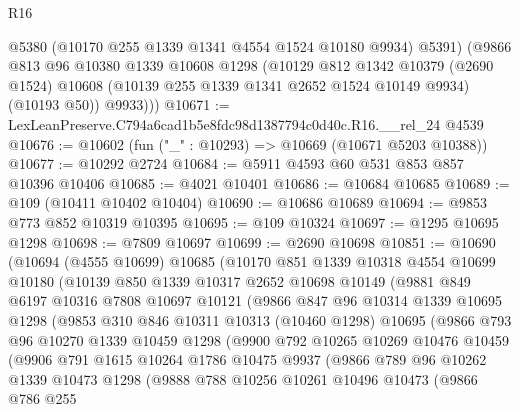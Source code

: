 \begin{lexlean}{R16}
\begin{coremodule}
          @5380
          (@10170 @255 @1339 @1341 @4554 @1524 @10180 @9934)
          @5391)
        (@9866
          @813
          @96
          @10380
          @1339
          @10608
          @1298
          (@10129
            @812
            @1342
            @10379
            (@2690 @1524)
            @10608
            (@10139 @255 @1339 @1341 @2652 @1524 @10149 @9934)
            (@10193 @50))
          @9933)))
@10671 := LexLeanPreserve.C794a6cad1b5e8fdc98d1387794c0d40c.R16.__rel_24 @4539
@10676 := @10602 (fun ("_" : @10293) => @10669 (@10671 @5203 @10388))
@10677 := @10292 @2724
@10684 := @5911 @4593 @60 @531 @853 @857 @10396 @10406
@10685 := @4021 @10401
@10686 := @10684 @10685
@10689 := @109 (@10411 @10402 @10404)
@10690 := @10686 @10689
@10694 := @9853 @773 @852 @10319 @10395
@10695 := @109 @10324
@10697 := @1295 @10695 @1298
@10698 := @7809 @10697
@10699 := @2690 @10698
@10851 := @10690
    (@10694
      (@4555 @10699)
      @10685
      (@10170
        @851
        @1339
        @10318
        @4554
        @10699
        @10180
        (@10139
          @850
          @1339
          @10317
          @2652
          @10698
          @10149
          (@9881
            @849
            @6197
            @10316
            @7808
            @10697
            @10121
            (@9866
              @847
              @96
              @10314
              @1339
              @10695
              @1298
              (@9853
                @310
                @846
                @10311
                @10313
                (@10460 @1298)
                @10695
                (@9866
                  @793
                  @96
                  @10270
                  @1339
                  @10459
                  @1298
                  (@9900
                    @792
                    @10265
                    @10269
                    @10476
                    @10459
                    (@9906
                      @791
                      @1615
                      @10264
                      @1786
                      @10475
                      @9937
                      (@9866
                        @789
                        @96
                        @10262
                        @1339
                        @10473
                        @1298
                        (@9888
                          @788
                          @10256
                          @10261
                          @10496
                          @10473
                          (@9866
                            @786
                            @255

\end{coremodule}
\end{lexlean}
